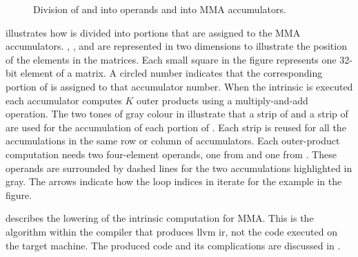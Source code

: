 \documentclass[\main/thesis.tex]{subfiles}
\begin{document}
\begin{figure}[t]
  \caption[Operand and Accumulator Layout in MMA]{Division of  and  into operands and  into MMA accumulators.}
  \label{fig:intrinsic}
\end{figure}

 illustrates how  is divided into portions that are assigned to the MMA accumulators.
, , and  are represented in two dimensions to illustrate the position of the elements in the matrices.
Each small square in the figure represents one 32-bit element of a matrix.
A circled number indicates that the corresponding portion of  is assigned to that accumulator number.
When the intrinsic is executed each accumulator computes $K$ outer products using a multiply-and-add operation.
The two tones of gray colour in  illustrate that a strip of  and a strip of  are used for the accumulation of each portion of .
Each strip is reused for all the accumulations in the same row or column of accumulators.
Each outer-product computation needs two four-element operands, one from  and one from .
These operands are surrounded by dashed lines for the two accumulations highlighted in gray.
The arrows indicate how the loop indices in  iterate for the example in the figure.

 describes the lowering of the intrinsic computation for MMA.
This is the algorithm within the compiler that produces \gls{llvm} \gls{ir}, not the code executed on the target machine.
The produced code and its complications are discussed in .
\end{document}
